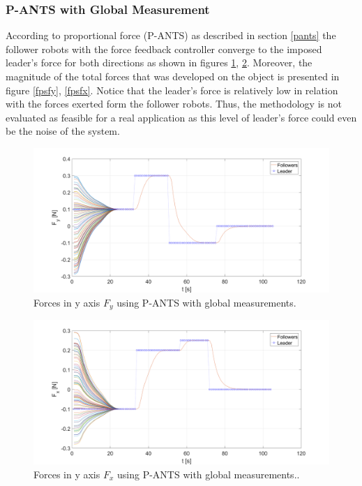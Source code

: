 \documentclass[letterpaper, 10 pt, conference]{ieeeconf}
\begin{document}
\subsubsection{P-ANTS with Global Measurement}
According to proportional force (P-ANTS) as described in section \ref{pants} the follower robots with the force feedback controller converge to the imposed leader's force for both directions as shown in figures \ref{fpfy}, \ref{fpfx}. Moreover, the magnitude of the total forces that was developed on the object is presented in figure \ref{fpsfy}, \ref{fpsfx}. Notice that the leader's force is relatively low in relation with the forces exerted form the follower robots. Thus, the methodology is not evaluated as feasible for a real application as this level of leader's force could even be the noise of the system.
\begin{figure}[!h]
	\includegraphics[width=.53\textwidth]{figures/P_ANTS_Fy.png}
	\centering
	\caption{Forces in y axis $F_y$ using P-ANTS with global measurements.}
	\label{fpfy}
\end{figure}
\begin{figure}[!h]
	\includegraphics[width=.53\textwidth]{figures/P_ANTS_Fx.png}
	\centering
	\caption{Forces in y axis $F_x$ using P-ANTS with global measurements..}
	\label{fpfx}
\end{figure}
\end{document}
